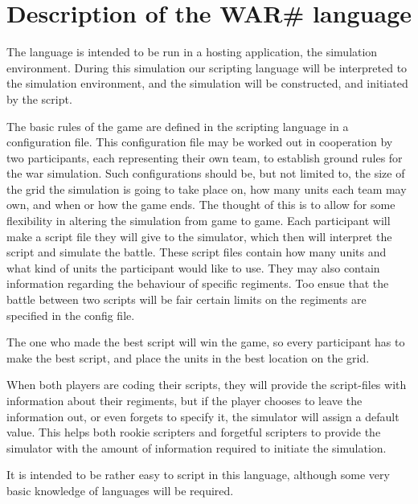 
\section{ Description of the WAR\# language }

	The language is intended to be run in a hosting application, the simulation environment. During this simulation our scripting language will be interpreted to the simulation environment, and the simulation will be constructed, and initiated by the script.
	
	The basic rules of the game are defined in the scripting language in a configuration file. This configuration file may be worked out in cooperation by two participants, each representing their own team, to establish ground rules for the war simulation. Such configurations should be, but not limited to, the size of the grid the simulation is going to take place on, how many units each team may own, and when or how the game ends.
	The thought of this is to allow for some flexibility in altering the simulation from game to game.
	Each participant will make a script file they will give to the simulator, 
	which then will interpret the script and simulate the battle. 
	These script files contain how many units and what kind of units the participant would like to use. They may also contain information regarding the behaviour of specific regiments. Too ensue that the battle between two scripts will be fair certain limits on the regiments are specified in the config file.

	The one who made the best script will win the game, so every participant has to make the best script, 
	and place the units in the best location on the grid.

When both players are coding their scripts, they will provide the script-files with information about their regiments, but if the player chooses to leave the information out, or even forgets to specify it, the simulator will assign a default value. This helps both rookie scripters and forgetful scripters to provide the simulator with the amount of information required to initiate the simulation.

It is intended to be rather easy to script in this language, although some very basic knowledge of languages will be required.


